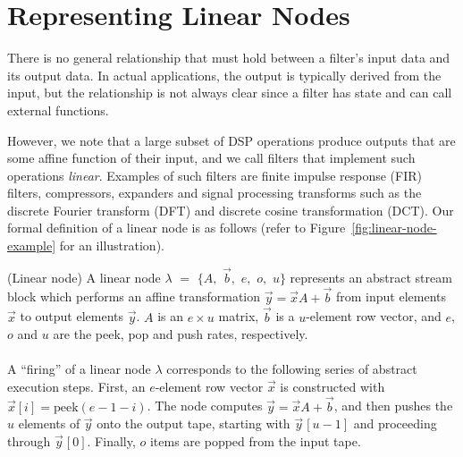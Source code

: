 \vspace{6pt}
\section{Representing Linear Nodes}
\label{sec:linearrep}

There is no general relationship that must hold between a
filter's input data and its output data. In actual applications, the
output is typically derived from the input, but the relationship is
not always clear since a filter has state and can call external
functions.

However, we note that a large subset of DSP operations produce outputs
that are some affine function of their input, and we call filters that
implement such operations {\it linear}. Examples of such filters are
finite impulse response (FIR) filters, compressors, expanders and
signal processing transforms such as the discrete Fourier transform
(DFT) and discrete cosine transformation (DCT).  Our formal definition
of a linear node is as follows (refer to
Figure~\ref{fig:linear-node-example} for an illustration).
\vspace{-4pt}
\begin{definition}(Linear node)
A linear node $\lambda$ $=$ $\{A,$ $\vec{b},$ $e,$ $o,$ $u\}$
represents an abstract stream block which performs an affine
transformation $\vec{y} = \vec{x} A + \vec{b}$ from input elements 
$\vec{x}$ to output elements $\vec{y}$. $A$ is an $e \times u$ matrix, $\vec{b}$ is a
$u$-element row vector, and $e$, $o$ and $u$ are the peek, pop and
push rates, respectively. \\ 
~ \vspace{-6pt} \\
A ``firing'' of a linear node $\lambda$ corresponds to the following
series of abstract execution steps.  First, an $e$-element row vector
$\vec{x}$ is constructed with $\vec{x}[i] = \mbox{peek}(e-1-i)$.  The node
computes $\vec{y} = \vec{x} A + \vec{b}$, and then pushes the $u$ elements 
of $\vec{y}$ onto the output tape, starting with $\vec{y}\hspace{1pt}[u-1]$ 
and proceeding through $\vec{y}\hspace{1pt}[0]$.
Finally, $o$ items are popped from the input tape.
\end{definition} \vspace{-2pt}


